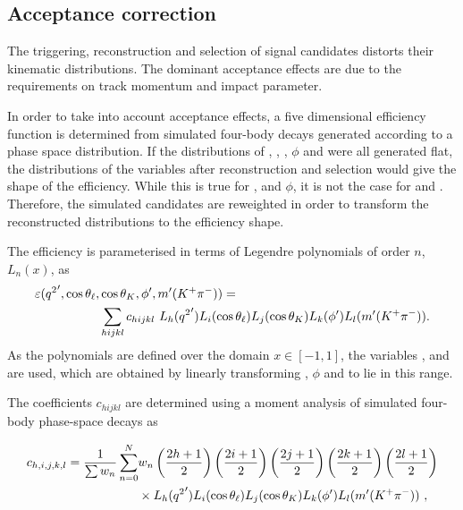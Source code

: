 \subsection{Acceptance correction}
\label{sec:kpimm:acceptance}

The triggering, reconstruction and selection of signal candidates distorts their kinematic distributions. The dominant acceptance effects are due to the requirements on track momentum and impact parameter.

In order to take into account acceptance effects, a five dimensional efficiency function is determined from simulated four-body \BdToKpimm decays generated according to a phase space distribution. If the distributions of \qsq, \ctl, \ctk, $\phi$ and \mkpi were all generated flat, the distributions of the variables after reconstruction and selection would give the shape of the efficiency.  While this is true for \ctl, \ctk and $\phi$, it is not the case for \qsq and \mkpi. Therefore, the simulated candidates are reweighted in order to transform the reconstructed distributions to the efficiency shape.

The efficiency is parameterised in terms of Legendre polynomials of order $n$, $L_n(x)$, as
\begin{equation}
\begin{split}
\varepsilon({q^2}',\cos{\theta_\ell},&\cos{\theta_K},\phi',m'({{K}^+}{{\pi}^-})) = \\
& \sum_{hijkl} c_{hijkl}~L_{h}({q^2}')L_{i}(\cos{\theta_\ell})L_{j}(\cos{\theta_K})L_{k}(\phi')L_{l}(m'({{K}^+}{{\pi}^-})).
 \end{split}
 \label{eqn:legendre}
\end{equation}
As the polynomials are defined over the domain $x\in[-1,1]$, the variables \qsqp, \phip and \mkpip are used, which are obtained by linearly transforming \qsq, $\phi$ and \mkpi to lie in this range.

The coefficients $c_{hijkl}$ are determined using a moment analysis of simulated four-body \BdToKpimm phase-space decays as

\begin{equation}
   \begin{split}
     c_{h,i,j,k,l} = \frac{1}{\sum w_{n}}\sum_{n=0}^{N}&w_{n}\left(\frac{2h+1}{2}\right)\left(\frac{2i+1}{2}\right)\left(\frac{2j+1}{2}\right)\left(\frac{2k+1}{2}\right)\left(\frac{2l+1}{2}\right)\\
     &\times L_{h}({q^2}')L_{i}(\cos{\theta_\ell})L_{j}(\cos{\theta_K})L_{k}(\phi')L_{l}(m'({{K}^+}{{\pi}^-}))~,
     \end{split}
 \end{equation}


